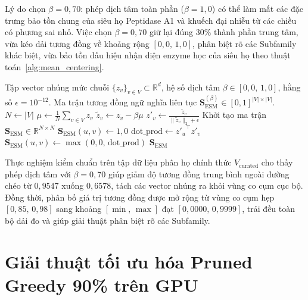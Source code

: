 Lý do chọn $\beta = 0{,}70$: phép dịch tâm toàn phần ($\beta = 1{,}0$) có thể làm mất các đặc trưng bảo tồn chung của siêu họ Peptidase A1 và khuếch đại nhiễu từ các chiều có phương sai nhỏ. Việc chọn $\beta = 0{,}70$ giữ lại đúng $30\%$ thành phần trung tâm, vừa kéo dải tương đồng về khoảng rộng $[0{,}0, \, 1{,}0]$, phân biệt rõ các Subfamily khác biệt, vừa bảo tồn dấu hiệu nhận diện enzyme học của siêu họ theo thuật toán~\ref{alg:mean_centering}.

\begin{algorithm}[htbp!]
\caption{Kỹ thuật dịch tâm Mean-Centering có kiểm soát trên vector nhúng ESM-2}
\label{alg:mean_centering}
\begin{algorithmic}[1]
\Require Tập vector nhúng mức chuỗi $\{z_v\}_{v \in V} \subset \mathbb{R}^d$, hệ số dịch tâm $\beta \in [0{,}0, \, 1{,}0]$, hằng số $\epsilon = 10^{-12}$.
\Ensure Ma trận tương đồng ngữ nghĩa liên tục $\mathbf{S}_{\text{ESM}}^{(\beta)} \in [0, 1]^{|V| \times |V|}$.
\State $N \gets |V|$
\State $\mu \gets \frac{1}{N} \sum_{v \in V} z_v$ 
    \State $\tilde{z}_v \gets z_v - \beta \mu$ 
    \State $z'_v \gets \frac{\tilde{z}_v}{\|\tilde{z}_v\|_2 + \epsilon}$ 
\EndFor
\State Khởi tạo ma trận $\mathbf{S}_{\text{ESM}} \in \mathbb{R}^{N \times N}$
        \State $\mathbf{S}_{\text{ESM}}(u, v) \gets 1{,}0$ 
    \Else
        \State $\text{dot\_prod} \gets {z'_u}^\top z'_v$
        \State $\mathbf{S}_{\text{ESM}}(u, v) \gets \max(0{,}0, \, \text{dot\_prod})$ 
    \EndIf
\EndFor
\State \Return $\mathbf{S}_{\text{ESM}}$
\end{algorithmic}
\end{algorithm}

Thực nghiệm kiểm chuẩn trên tập dữ liệu phân họ chính thức $V_{\text{curated}}$ cho thấy phép dịch tâm với $\beta = 0{,}70$ giúp giảm độ tương đồng trung bình ngoài đường chéo từ $0{,}9547$ xuống $0{,}6578$, tách các vector nhúng ra khỏi vùng co cụm cục bộ. Đồng thời, phân bố giá trị tương đồng được mở rộng từ vùng co cụm hẹp $[0{,}85, \, 0{,}98]$ sang khoảng $[\min, \, \max]$ đạt $[0{,}0000, \, 0{,}9999]$, trải đều toàn bộ dải đo và giúp giải thuật phân biệt rõ các Subfamily.

\section{Giải thuật tối ưu hóa Pruned Greedy 90\% trên GPU}
\label{sec:methodology_gpu_pruned_greedy}

